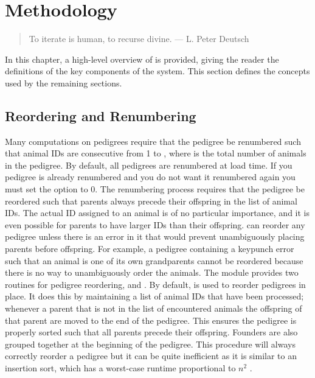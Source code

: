 \chapter{Methodology}
\label{cha:methodology}
\begin{quote}
To iterate is human, to recurse divine. --- L. Peter Deutsch
\end{quote}
In this chapter, a high-level overview of \PYPEDAL{} is provided, giving
the reader the definitions of the key components of the system. This section
defines the concepts used by the remaining sections.
\section{Reordering and Renumbering}\label{sec:methodology-reordering-and-renumbering}
Many computations on pedigrees require that the pedigree be renumbered such that animal IDs are consecutive from 1 to , where  is the total number of animals in the pedigree. By default, all pedigrees are renumbered at load time. If you pedigree is already renumbered and you do not want it renumbered again you must set the  option to 0. The renumbering process requires that the pedigree be reordered such that parents always precede their offspring in the list of animal IDs. The actual ID assigned to an animal is of no particular importance, and it is even possible for parents to have larger IDs than their offspring.  \PyPedal{} can reorder any pedigree unless there is an error in it that would prevent unambiguously placing parents before offspring.  For example, a pedigree containing a keypunch error such that an animal is one of its own grandparents cannot be reordered because there is no way to unambiguously order the animals.  The  module provides two routines for pedigree reordering,  and .  By default,  is used to reorder pedigrees in place.  It does this by maintaining a list of animal IDs that have been processed; whenever a parent that is not in the  list of encountered animals the offspring of that parent are moved to the end of the pedigree.  This ensures the pedigree is properly sorted such that all parents precede their offspring. Founders are also grouped together at the beginning of the pedigree. This procedure will always correctly reorder a pedigree but it can be quite inefficient as it is similar to an insertion sort, which has a worst-case runtime proportional to $n^{2}$ \cite{Cormen2003}.

